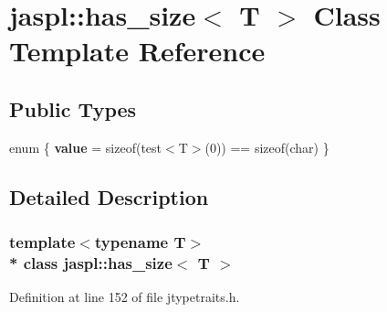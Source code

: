 \hypertarget{classjaspl_1_1has__size}{}\section{jaspl\+:\+:has\+\_\+size$<$ T $>$ Class Template Reference}
\label{classjaspl_1_1has__size}
\subsection*{Public Types}
\begin{DoxyCompactItemize}
\item 
enum \{ {\bfseries value} = sizeof(test$<$T$>$(0)) == sizeof(char)
 \}\hypertarget{classjaspl_1_1has__size_a8ac8f23099abf907222335e3447b6480}{}\label{classjaspl_1_1has__size_a8ac8f23099abf907222335e3447b6480}

\end{DoxyCompactItemize}


\subsection{Detailed Description}
\subsubsection*{template$<$typename T$>$\\*
class jaspl\+::has\+\_\+size$<$ T $>$}



Definition at line 152 of file jtypetraits.\+h.

